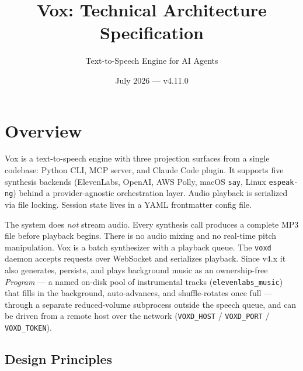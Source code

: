 \documentclass[a4paper,10pt]{article}
\begin{document}
\title{Vox: Technical Architecture Specification}
\author{Text-to-Speech Engine for AI Agents}
\date{July 2026 --- v4.11.0}
\maketitle

\tableofcontents
\newpage

\section{Overview}

Vox is a text-to-speech engine with three projection surfaces from a
single codebase: Python CLI, MCP server, and Claude Code plugin.  It
supports five synthesis backends (ElevenLabs, OpenAI, AWS Polly, macOS
\texttt{say}, Linux \texttt{espeak-ng}) behind a provider-agnostic
orchestration layer.  Audio playback is serialized via file locking.
Session state lives in a YAML frontmatter config file.

The system does \emph{not} stream audio.  Every synthesis call produces
a complete MP3 file before playback begins.  There is no audio mixing and
no real-time pitch manipulation.  Vox is a batch synthesizer with
a playback queue.  The \texttt{voxd} daemon accepts requests over
WebSocket and serializes playback.  Since v4.x it also generates,
persists, and plays background music as an ownership-free
\emph{Program} --- a named on-disk pool of instrumental tracks
(\texttt{elevenlabs\_music}) that fills in the background, auto-advances,
and shuffle-rotates once full --- through a separate reduced-volume
subprocess outside the speech queue, and can be driven from a remote
host over the network (\texttt{VOXD\_HOST} / \texttt{VOXD\_PORT} /
\texttt{VOXD\_TOKEN}).

\subsection{Design Principles}
\end{document}
